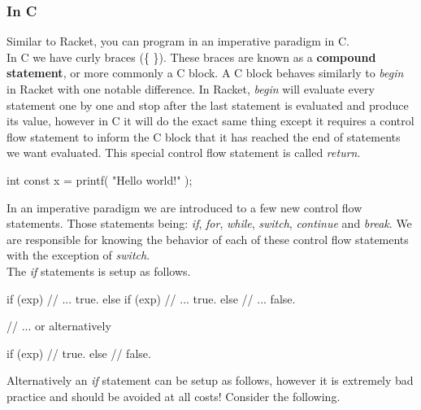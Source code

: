 
\subsubsection*{In C}

Similar to Racket, you can program in an imperative paradigm in C.\\

In C we have curly braces (\{ \}). These braces are known as a \textbf{compound statement}, or more commonly a C block. A C block behaves similarly to \emph{begin} in Racket with one notable difference. In Racket, \emph{begin} will evaluate every statement one by one and stop after the last statement is evaluated and produce its value, however in C it will do the exact same thing except it requires a control flow statement to inform the C block that it has reached the end of statements we want evaluated. This special control flow statement is called \emph{return}.\\


\begin{code}[c]
int const x = printf( "Hello world!\n" );
\end{code}


In an imperative paradigm we are introduced to a few new control flow statements. Those statements being: \emph{if}, \emph{for}, \emph{while}, \emph{switch}, \emph{continue} and \emph{break}. We are responsible for knowing the behavior of each of these control flow statements with the exception of \emph{switch}.\\

The \emph{if} statements is setup as follows.\\

\begin{code}[c]
if (exp) {
	// ... true.
} else if (exp) {
	// ... true.
} else {
	// ... false.
}

// ... or alternatively

if (exp)
	// true.
else
	// false.
\end{code}

Alternatively an \emph{if} statement can be setup as follows, however it is extremely bad practice and should be avoided at all costs! Consider the following.\\

